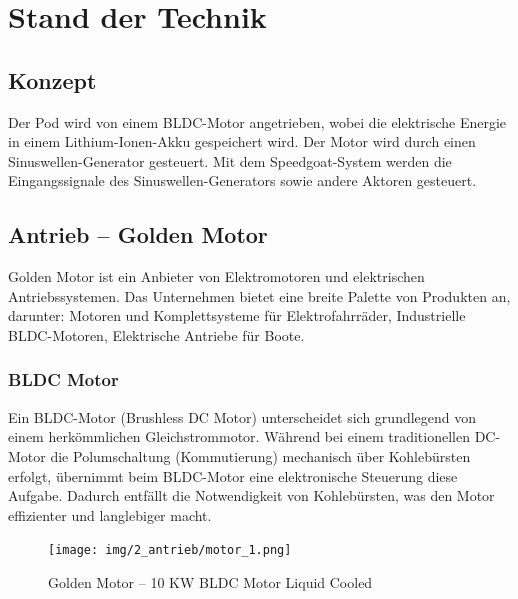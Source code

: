 \chapter{Stand der Technik}

\section{Konzept}
Der Pod wird von einem BLDC-Motor angetrieben, wobei die elektrische Energie in einem Lithium-Ionen-Akku gespeichert wird. Der Motor wird durch einen Sinuswellen-Generator gesteuert. Mit dem Speedgoat-System werden die Eingangssignale des Sinuswellen-Generators sowie andere Aktoren gesteuert.

\section{Antrieb – Golden Motor}
\label{Golden_Motor}


Golden Motor ist ein Anbieter von Elektromotoren und elektrischen Antriebssystemen. Das Unternehmen bietet eine breite Palette von Produkten an, darunter:
Motoren und Komplettsysteme für Elektrofahrräder, Industrielle BLDC-Motoren, Elektrische Antriebe für Boote.


\subsection{BLDC Motor}
\label{BLDC_Motor}


Ein BLDC-Motor (Brushless DC Motor) unterscheidet sich grundlegend von einem herkömmlichen Gleichstrommotor. Während bei einem traditionellen DC-Motor die Polumschaltung (Kommutierung) mechanisch über Kohlebürsten erfolgt, übernimmt beim BLDC-Motor eine elektronische Steuerung diese Aufgabe. Dadurch entfällt die Notwendigkeit von Kohlebürsten, was den Motor effizienter und langlebiger macht\cite{mathworks:bldc_motor}.

\begin{figure}[ht]
	\begin{center}
		\texttt{[image: img/2\_antrieb/motor\_1.png]}
		\caption{Golden Motor – 10 KW BLDC Motor Liquid Cooled}
		\label{img_2_2:antrieb_motor:1}
	\end{center}
\end{figure}




